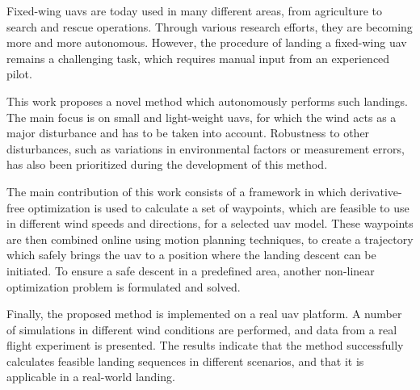 Fixed-wing \acp{uav} are today used in many different areas, from agriculture to search and 
rescue operations. Through various research efforts, they are becoming more and more autonomous. However, the procedure of landing a fixed-wing \ac{uav} 
remains a challenging task, which requires manual input from an experienced pilot. 

This work proposes a novel method which autonomously performs such landings. The main focus is on 
small and light-weight \acp{uav}, for which the wind acts as a major disturbance and has to be taken into account. 
Robustness to other disturbances, such as variations in environmental factors or measurement errors, has also been prioritized during the development 
of this method.

The main contribution of this work consists of a framework in which der\-iva\-tive-free optimization is used to 
calculate a set of waypoints, which are feasible to use in different wind speeds and directions, for a selected \ac{uav} model. 
These waypoints are then combined online using motion planning techniques, to create a trajectory which safely brings the \ac{uav} to a 
position where the landing descent can be initiated. To ensure a safe descent in a predefined area, another non-linear optimization problem is 
formulated and solved. 

Finally, the proposed method is implemented on a real \ac{uav} platform. A number of simulations in different wind conditions are performed, and data from 
a real flight experiment is presented. The results indicate that the method successfully calculates feasible landing sequences in different scenarios, and 
that it is applicable in a real-world landing.

